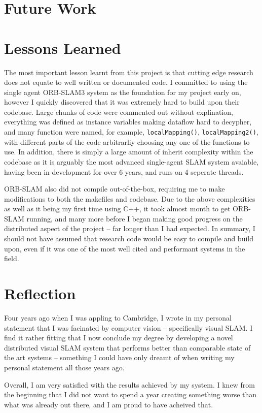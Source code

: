

\label{sec:5}

\section{Future Work}
\label{sec:future-work}

\section{Lessons Learned}
\label{sec:lessons-learned}
The most important lesson learnt from this project is that cutting edge research does not equate to well written or documented code. I committed to using the single agent ORB-SLAM3 system as the foundation for my project early on, however I quickly discovered that it was extremely hard to build upon their codebase. Large chunks of code were commented out without explination, everything was defined as instance variables making dataflow hard to decypher, and many function were named, for example, \texttt{localMapping()}, \texttt{localMapping2()}, with different parts of the code arbitrarliy choosing any one of the functions to use. In addition, there is simply a large amount of inherit complexity within the codebase as it is arguably the most advanced single-agent SLAM system avaiable, having been in development for over 6 years, and runs on 4 seperate threads.

ORB-SLAM also did not compile out-of-the-box, requiring me to make modifications to both the makefiles and codebase. Due to the above complexities as well as it being my first time using C++, it took almost month to get ORB-SLAM running, and many more before I began making good progress on the distributed aspect of the project – far longer than I had expected. In summary, I should not have assumed that research code would be easy to compile and build upon, even if it was one of the most well cited and performant systems in the field. %

\section{Reflection}
\label{sec:reflection}

Four years ago when I was appling to Cambridge, I wrote in my personal statement that I was facinated by computer vision – specifically visual SLAM. I find it rather fitting that I now conclude my degree by developing a novel distributed visual SLAM system that performs better than comparable state of the art systems – something I could have only dreamt of when writing my personal statement all those years ago.

Overall, I am very satisfied with the results achieved by my system. I knew from the beginning that I did not want to spend a year creating something worse than what was already out there, and I am proud to have acheived that.